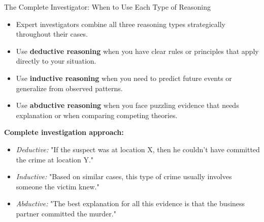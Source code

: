 \documentclass{beamer}
\begin{document}
\begin{frame}{The Complete Investigator: When to Use Each Type of Reasoning}
	\begin{itemize}
		\item Expert investigators combine all three reasoning types strategically throughout their cases.
		\item Use \textbf{deductive reasoning} when you have clear rules or principles that apply directly to your situation.
		\item Use \textbf{inductive reasoning} when you need to predict future events or generalize from observed patterns.
		\item Use \textbf{abductive reasoning} when you face puzzling evidence that needs explanation or when comparing competing theories.
	\end{itemize}
	
	\begin{example}
		\scriptsize
		\textbf{Complete investigation approach:}
		\begin{itemize}
			\item \textit{Deductive:} "If the suspect was at location X, then he couldn't have committed the crime at location Y."
			\item \textit{Inductive:} "Based on similar cases, this type of crime usually involves someone the victim knew."
			\item \textit{Abductive:} "The best explanation for all this evidence is that the business partner committed the murder."
		\end{itemize}
	\end{example}
\end{frame}
\end{document}
